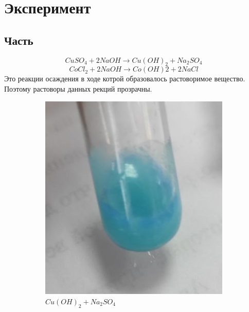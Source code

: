 \section{Эксперимент}
\subsection{Часть}
\begin{equation} 
    CuSO_4 + 2NaOH \xrightarrow{}  Cu(OH)_2 + Na_2SO_4
\end{equation} 
\begin{equation} 
    CoCl_2 + 2NaOH \xrightarrow{} Co(OH)2 + 2NaCl
\end{equation} 
Это реакции осаждения в ходе котрой образовалось растоворимое 
вещество. Поэтому растоворы данных рекций прозрачны.

\begin{figure}[h]
    \centering
    \begin{subfigure}[b]{0.45\textwidth}
        \centering
        \includegraphics[width=\textwidth]{Ex_5/Cu_1.jpg}
        \caption{$Cu(OH)_2 + Na_2SO_4$}
    \end{subfigure}
    \quad
    \begin{subfigure}[b]{0.45\textwidth}
        \centering

\end{subfigure}
\end{figure}

